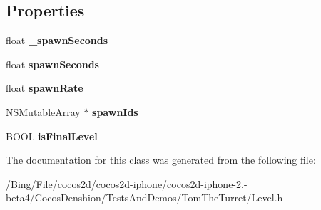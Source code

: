 \subsection*{Properties}
\begin{DoxyCompactItemize}
\item 
\hypertarget{interface_action_level_a029e02e2c099d74e5e3257d46940bd37}{float {\bfseries \-\_\-spawn\-Seconds}}\label{interface_action_level_a029e02e2c099d74e5e3257d46940bd37}

\item 
\hypertarget{interface_action_level_acf6d1bfa9f59df66de505abeaae5c978}{float {\bfseries spawn\-Seconds}}\label{interface_action_level_acf6d1bfa9f59df66de505abeaae5c978}

\item 
\hypertarget{interface_action_level_aca3ce616a96504d4b19ec2643854a9d0}{float {\bfseries spawn\-Rate}}\label{interface_action_level_aca3ce616a96504d4b19ec2643854a9d0}

\item 
\hypertarget{interface_action_level_aeaeec0f13763f317c333be4c40a055d5}{N\-S\-Mutable\-Array $\ast$ {\bfseries spawn\-Ids}}\label{interface_action_level_aeaeec0f13763f317c333be4c40a055d5}

\item 
\hypertarget{interface_action_level_a2544d9b35cc9572d9f8d2c643b8cda17}{B\-O\-O\-L {\bfseries is\-Final\-Level}}\label{interface_action_level_a2544d9b35cc9572d9f8d2c643b8cda17}

\end{DoxyCompactItemize}


The documentation for this class was generated from the following file\-:\begin{DoxyCompactItemize}
\item 
/\-Bing/\-File/cocos2d/cocos2d-\/iphone/cocos2d-\/iphone-\/2.-\/beta4/\-Cocos\-Denshion/\-Tests\-And\-Demos/\-Tom\-The\-Turret/Level.\-h\end{DoxyCompactItemize}
